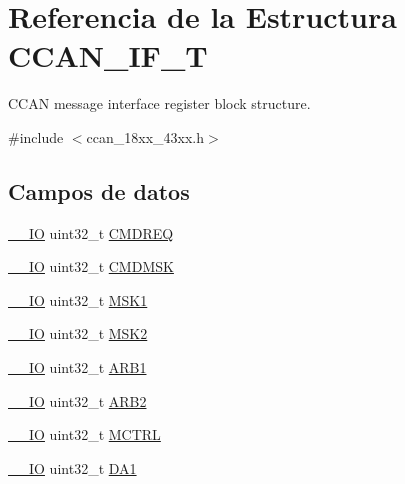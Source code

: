 \hypertarget{struct_c_c_a_n___i_f___t}{}\section{Referencia de la Estructura C\+C\+A\+N\+\_\+\+I\+F\+\_\+T}
\label{struct_c_c_a_n___i_f___t}


C\+C\+AN message interface register block structure.  




{\ttfamily \#include $<$ccan\+\_\+18xx\+\_\+43xx.\+h$>$}

\subsection*{Campos de datos}
\begin{DoxyCompactItemize}
\item 
\hyperlink{core__sc300_8h_aec43007d9998a0a0e01faede4133d6be}{\+\_\+\+\_\+\+IO} uint32\+\_\+t \hyperlink{struct_c_c_a_n___i_f___t_a76c60555cc759597b05f8d575abfa2f0}{C\+M\+D\+R\+EQ}
\item 
\hyperlink{core__sc300_8h_aec43007d9998a0a0e01faede4133d6be}{\+\_\+\+\_\+\+IO} uint32\+\_\+t \hyperlink{struct_c_c_a_n___i_f___t_a6b639f249c145d50a97b78a8fc31028b}{C\+M\+D\+M\+SK}
\item 
\hyperlink{core__sc300_8h_aec43007d9998a0a0e01faede4133d6be}{\+\_\+\+\_\+\+IO} uint32\+\_\+t \hyperlink{struct_c_c_a_n___i_f___t_afd1b3d12f18670bb9595536434e69d89}{M\+S\+K1}
\item 
\hyperlink{core__sc300_8h_aec43007d9998a0a0e01faede4133d6be}{\+\_\+\+\_\+\+IO} uint32\+\_\+t \hyperlink{struct_c_c_a_n___i_f___t_ab6dd6d6d5b2220dfe7165d0a672d507b}{M\+S\+K2}
\item 
\hyperlink{core__sc300_8h_aec43007d9998a0a0e01faede4133d6be}{\+\_\+\+\_\+\+IO} uint32\+\_\+t \hyperlink{struct_c_c_a_n___i_f___t_a422ddf34026d15ba1fc9d263af854abc}{A\+R\+B1}
\item 
\hyperlink{core__sc300_8h_aec43007d9998a0a0e01faede4133d6be}{\+\_\+\+\_\+\+IO} uint32\+\_\+t \hyperlink{struct_c_c_a_n___i_f___t_ac8bf4742838ab6426e88ef2c97776605}{A\+R\+B2}
\item 
\hyperlink{core__sc300_8h_aec43007d9998a0a0e01faede4133d6be}{\+\_\+\+\_\+\+IO} uint32\+\_\+t \hyperlink{struct_c_c_a_n___i_f___t_a6f1d320c5d95a0c288d463dd2b12bca4}{M\+C\+T\+RL}
\item 
\hyperlink{core__sc300_8h_aec43007d9998a0a0e01faede4133d6be}{\+\_\+\+\_\+\+IO} uint32\+\_\+t \hyperlink{struct_c_c_a_n___i_f___t_a0f6d287d59f505a494b384fcb846c333}{D\+A1}

\end{DoxyCompactItemize}
